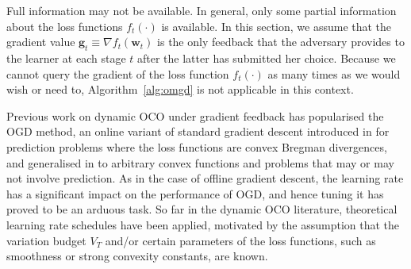 \begin{mccorrection}
Full information may not be available. In general, only some partial information about the loss functions $f_t(\cdot)$ is available. In this section, we assume that the gradient value $\mathbf{g}_t \equiv \nabla f_t(\mathbf{w}_t)$ is the only feedback that the adversary provides to the learner at each stage $t$ after the latter has submitted her choice. Because we cannot query the gradient of the loss function $f_t(\cdot)$ as many times as we would wish or need to, Algorithm~\ref{alg:omgd} is not applicable in this context.

Previous work on dynamic OCO under gradient feedback has popularised the OGD method, an online variant of standard gradient descent introduced in \citep{cesa-bianchi94} for prediction problems where the loss functions are convex Bregman divergences, and generalised in \citep{zinkevich03} to arbitrary convex functions and problems that may or may not involve prediction. As in the case of offline gradient descent, the learning rate has a significant impact on the performance of OGD, and hence tuning it has proved to be an arduous task. So far in the dynamic OCO literature, theoretical learning rate schedules have been applied, motivated by the assumption that the variation budget $V_T$ and/or certain parameters of the loss functions, such as smoothness or strong convexity constants, are known.


\end{mccorrection}
